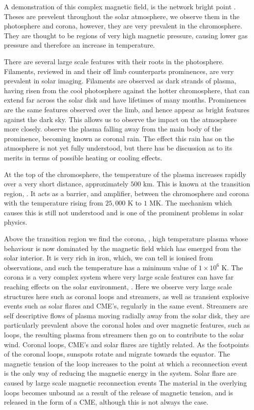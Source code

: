 A demonstration of this complex magnetic field, is the network bright point \cite{Muller1992}.
Theses are prevelent throughout the solar atmosphere, we observe them in the photosphere and corona, however, they are very prevalent in the chromosphere.
They are thought to be regions of very high magnetic pressure, causing lower
 gas pressure and therefore an increase in temperature.


There are several large scale features with their roots in the photosphere.
Filaments, reviewed in \cite{Engvold2004} and their off limb counterparts prominences, are very prevalent in solar imaging.
Filaments are observed as dark strands of plasma, having risen from the cool photosphere against the hotter chromosphere, that can extend far across the solar disk and have lifetimes of many months.
Prominences are the same features observed over the limb, and hence appear as bright features against the dark sky.
This allows us to observe the impact on the atmosphere more closely. 
\cite{Antolin2011} observe the plasma falling away from the main body of the prominence, becoming known as coronal rain.
The effect this rain has on the atmosphere is not yet fully understood, but there has be discussion as to its merits in terms of possible heating or cooling effects.

At the top of the chromosphere, the temperature of the plasma increases rapidly over a very short distance, approximately $500$ km. 
This is known at the transition region, \cite{Mariska1986}.
It acts as a barrier, and amplifier, between the chromosphere and corona with the temperature rising from $25,000$ K to $1$ MK. The mechanism which causes this is still not understood and is one of the prominent problems in solar physics.


Above the transition region we find the corona, \cite{Athay1976}, high temperature plasma whose behaviour is now dominated by the magnetic field which has emerged from the solar interior.
It is very rich in iron, which, we can tell is ionised from observations, and such the temperature has a minimum value of $1 \times 10^6$ K.
The corona is a very complex system where very large scale features can have far reaching effects on the solar environment, \cite{Reale2014}.
Here we observe very large scale structures here such as coronal loops and streamers, as well as transient explosive events such as solar flares and CME's, regularly in the same event.
Streamers are self descriptive flows of plasma moving radially away from the solar disk, they are particularly prevalent above the coronal holes and over magnetic features, such as loops, the resulting plasma from streamers then go on to contribute to the solar wind.
Coronal loops, CME's and solar flares are tightly related.
As the footpoints of the coronal loops, sunspots rotate and migrate towards the equator. 
The magnetic tension of the loop increases to the point at which a reconnection event is the only way of reducing the magnetic energy in the system.
Solar flare are caused by large scale magnetic reconnection events
The material in the overlying loops becomes unbound as a result of the release of magnetic tension, and is released in the form of a CME, although this is not always the case.

